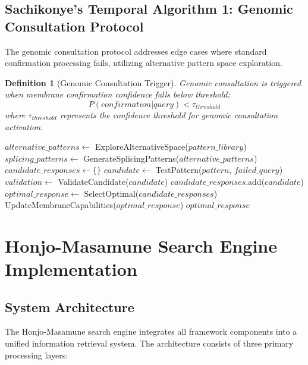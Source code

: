 \documentclass[12pt,a4paper]{article}
\newtheorem{definition}{Definition}
\begin{document}
\subsection{Sachikonye's Temporal Algorithm 1: Genomic Consultation Protocol}

The genomic consultation protocol addresses edge cases where standard confirmation processing fails, utilizing alternative pattern space exploration.

\begin{definition}[Genomic Consultation Trigger]
Genomic consultation is triggered when membrane confirmation confidence falls below threshold:
\begin{equation}
P(confirmation | query) < \tau_{threshold}
\end{equation}
where $\tau_{threshold}$ represents the confidence threshold for genomic consultation activation.
\end{definition}

\begin{algorithm}
\caption{Sachikonye's Temporal Algorithm 1}
\begin{algorithmic}
    \State $alternative\_patterns \gets$ ExploreAlternativeSpace($pattern\_library$)
    \State $splicing\_patterns \gets$ GenerateSplicingPatterns($alternative\_patterns$)
    \State $candidate\_responses \gets \{\}$
        \State $candidate \gets$ TestPattern($pattern$, $failed\_query$)
        \State $validation \gets$ ValidateCandidate($candidate$)
            \State $candidate\_responses$.add($candidate$)
        \EndIf
    \EndFor
    \State $optimal\_response \gets$ SelectOptimal($candidate\_responses$)
    \State UpdateMembraneCapabilities($optimal\_response$)
    \State \Return $optimal\_response$
\EndProcedure
\end{algorithmic}
\end{algorithm}

\section{Honjo-Masamune Search Engine Implementation}

\subsection{System Architecture}

The Honjo-Masamune search engine integrates all framework components into a unified information retrieval system. The architecture consists of three primary processing layers:
\end{document}
